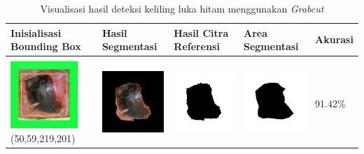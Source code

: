 \begin{table}[H]
	\centering
	\caption{Visualisasi hasil deteksi keliling luka hitam menggunakan \emph{Grabcut}}
	\label{tabel_hasil_3}
	\begin{tabular}{|m{1.0in}|m{1.0in}|m{1.0in}|m{1.0in}|m{0.6in}|}
		\hline
		\textbf{Inisialisasi Bounding Box} & \textbf{Hasil Segmentasi} & \textbf{Hasil Citra Referensi} & \textbf{Area Segmentasi} & \textbf{Akurasi} \\
		\hline
		
		&  &  & \\
		\includegraphics[width=1.0in]{gambar/hasil_segmentasi/luka_hitam/image_18_rect.jpg} {\centering\fontsize{10}{10}\selectfont(50,59,219,201)}&
		\includegraphics[width=1.0in]{gambar/hasil_segmentasi/luka_hitam/result_18.jpg}&
		\includegraphics[width=1.0in]{gambar/hasil_segmentasi/luka_hitam/mask_r_18.jpg}&
		\includegraphics[width=1.0in]{gambar/hasil_segmentasi/luka_hitam/18_r.jpg}&
		91.42\% \\
		\hline


\end{tabular}
\end{table}
